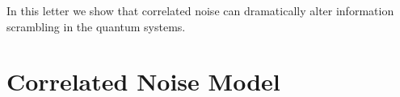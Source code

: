 \documentclass[aps,pra,reprint,amsmath,amssymb]{revtex4-2}
\newcommand\comb[2][^n]{\prescript{#1\mkern-0.5mu}{}C_{#2}}
\begin{document}
In this letter we show that correlated noise can dramatically alter information scrambling in the quantum systems.  

\section{Correlated Noise Model}
\end{document}
